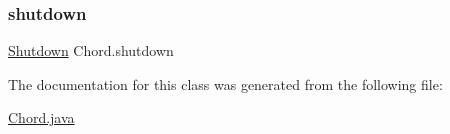 \hypertarget{class_chord_a41961ec2d829d7a2c765fe7f8a23a64c}{}\label{class_chord_a41961ec2d829d7a2c765fe7f8a23a64c} 
\subsubsection{\texorpdfstring{shutdown}{shutdown}}
{\footnotesize\ttfamily \hyperlink{class_shutdown}{Shutdown} Chord.\+shutdown\hspace{0.3cm}{\ttfamily [private]}}



The documentation for this class was generated from the following file\+:\begin{DoxyCompactItemize}
\item 
\hyperlink{_chord_8java}{Chord.\+java}\end{DoxyCompactItemize}
